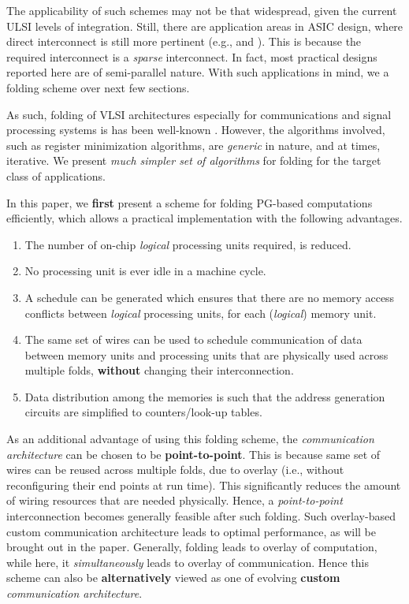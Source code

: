 \documentclass[12pt]{article}
\begin{document}
The applicability of such schemes may not be that
widespread, given the current ULSI levels of integration. Still,
there are application areas in ASIC design, where direct
interconnect is still more pertinent (e.g., \cite{expanders} and
\cite{ldpc_pap}). This is because the required interconnect is a
\textit{sparse} interconnect. In fact, most practical designs reported here
are of semi-parallel nature. With such applications in mind, we a folding
scheme over next few sections.

As such, folding of VLSI architectures especially for communications and
signal processing systems is has been well-known \cite{parhi_book}.
However, the algorithms involved, such as register minimization algorithms,
are \textit{generic} in nature, and at times, iterative. We present
\textit{much
simpler set of algorithms} for folding for the target class of
applications.

In this paper, we \textbf{first} present a scheme for folding PG-based
computations efficiently, which allows a practical implementation with the
following advantages.

\begin{enumerate}
\item The number of on-chip \textit{logical} processing units required, is reduced.
\item No processing unit is ever idle in a machine cycle.
\item A schedule can be generated which ensures that there are no
        memory access conflicts between \textit{logical} processing units, for each
        (\textit{logical}) memory unit.
\item The same set of wires can be used to schedule communication of data
between memory units and processing units that are physically used across
multiple folds, \textbf{without} changing their interconnection.
\item Data distribution among the memories is such that the address
        generation circuits are simplified to counters/look-up tables.
\end{enumerate}

As an additional advantage of using this folding scheme, the
\textit{communication architecture} can be chosen to be
\textbf{point-to-point}. This is because same set of wires can be reused across
multiple folds, due to overlay (i.e., without reconfiguring their end points
at run time). This significantly reduces the amount of wiring resources
that are needed physically. Hence, a \textit{point-to-point} interconnection becomes
generally feasible after such folding. Such overlay-based custom
communication architecture leads to optimal performance, as will be brought
out in the paper. Generally, folding leads to overlay of computation, while
here, it \textit{simultaneously} leads to overlay of communication. Hence this
scheme can also be \textbf{alternatively} viewed as one of evolving
\textbf{custom} \textit{communication architecture}.
\end{document}
